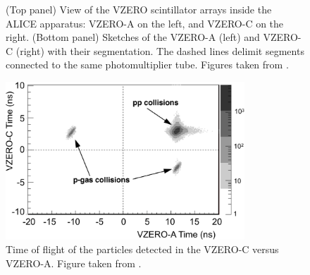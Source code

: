 \begin{figure}[t]
\centering
{}	
	\caption{(Top panel) View of the VZERO scintillator arrays inside the ALICE apparatus: VZERO-A on the left, and VZERO-C on the right. (Bottom panel) Sketches of the VZERO-A (left) and VZERO-C (right) with their segmentation. The dashed lines delimit segments connected to the same photomultiplier tube. Figures taken from \cite{alicecollaborationALICEExperimentJourney2022}\cite{alicecollaborationPerformanceALICEVZERO2013}.}
	\label{fig:VZEROdetector}
\end{figure}

\begin{figure}[h]
	\centering
	\includegraphics[width=0.8\textwidth]{Figs/Chapter3/Fig6_2-4228.png}
	\caption{Time of flight of the particles detected in the VZERO-C versus VZERO-A. Figure taken from \cite{alicecollaborationPerformanceALICEVZERO2013}.}
	\label{fig:VZERObeamgas}
\end{figure}



